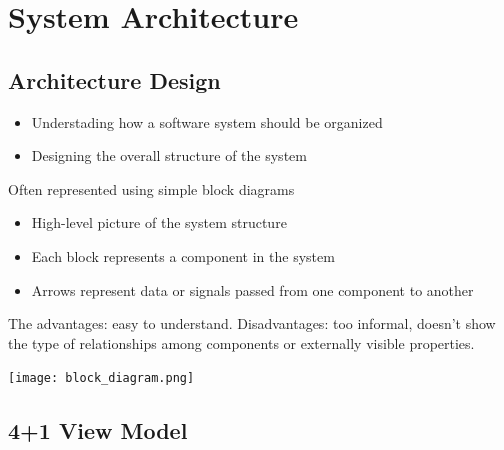 \documentclass{article}
\begin{document}
    \section*{System Architecture}

    \subsection*{Architecture Design}

    \begin{itemize}
        \item Understading how a software system should be organized
        \item Designing the overall structure of the system
    \end{itemize}

    Often represented using simple block diagrams 
    \begin{itemize}
        \item High-level picture of the system structure
        \item Each block represents a component in the system 
        \item Arrows represent data or signals passed from one component to another 
    \end{itemize}

    The advantages: easy to understand. Disadvantages: too informal, doesn't show the type of 
    relationships among components or externally visible properties.

    \begin{center}
        \texttt{[image: block\_diagram.png]}
    \end{center}

    \subsection*{4+1 View Model}
\end{document}
